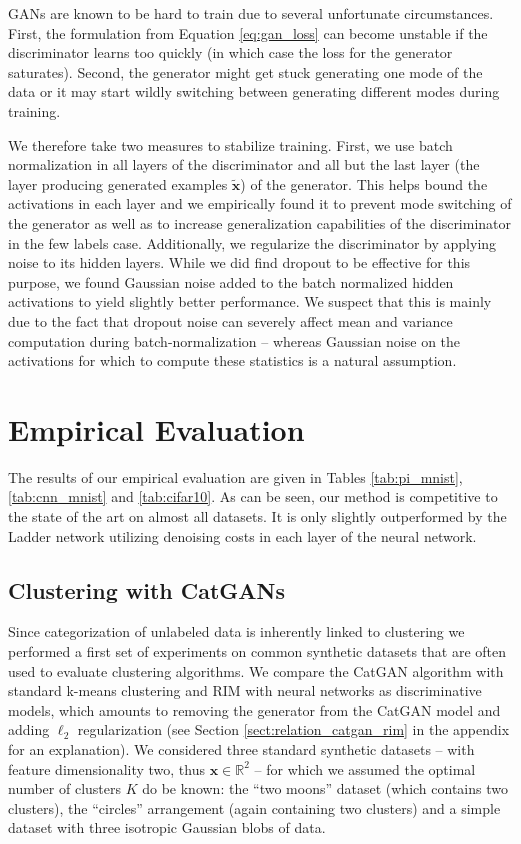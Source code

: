 \documentclass{article} \usepackage{iclr2016_conference,times}
\newcommand{\bx}{\mathbf{x}}
\begin{document}
GANs are known to be hard to train due to several unfortunate
circumstances. First, the formulation from Equation
\eqref{eq:gan_loss} can become unstable if the discriminator learns
too quickly (in which case the loss for the generator saturates). Second, the
generator might get stuck generating one mode of the
data 
or it may start wildly switching between generating different modes during
training.

We therefore take two measures to stabilize training. First, we use
batch normalization \citep{Ioffe_2015} in all layers of the
discriminator and all but the last layer (the layer producing
generated examples $\tilde{\bx}$) of the generator. This helps bound
the activations in each layer and we empirically found it to prevent
mode switching of the generator as well as to increase generalization
capabilities of the discriminator in the few labels
case. Additionally, we regularize the discriminator by applying noise
to its hidden layers. While we did find dropout
\citep{Hinton_arxiv2012} to be effective for this purpose, we found
Gaussian noise added to the batch normalized hidden activations to
yield slightly better performance.
We suspect that this is mainly due to the fact that dropout noise can
severely affect mean and variance computation during
batch-normalization -- whereas Gaussian noise on the activations for
which to compute these statistics is a natural assumption.

\section{Empirical Evaluation}
The results of our empirical evaluation are given in Tables
\ref{tab:pi_mnist}, \ref{tab:cnn_mnist} and \ref{tab:cifar10}. As can
be seen, our method is competitive to the state of the art on almost
all datasets. It is only slightly outperformed by the Ladder network
utilizing denoising costs in each layer of the neural network.

\subsection{Clustering with CatGANs}
Since categorization of unlabeled data is inherently linked to
clustering we performed a first set of experiments on common synthetic
datasets that are often used to evaluate clustering algorithms. We
compare the CatGAN algorithm with standard k-means clustering and RIM
with neural networks as discriminative models, which amounts to
removing the generator from the CatGAN model and adding $\ell_2$
regularization (see Section \ref{sect:relation_catgan_rim} in the
appendix for an explanation). We considered three standard synthetic
datasets -- with feature dimensionality two, thus
$\bx \in \mathbb{R}^2$ -- for which we assumed the optimal number of
clusters $K$ do be known: the ``two moons'' dataset (which contains
two clusters), the ``circles'' arrangement (again containing two
clusters) and a simple dataset with three isotropic Gaussian blobs of
data. 
\end{document}
